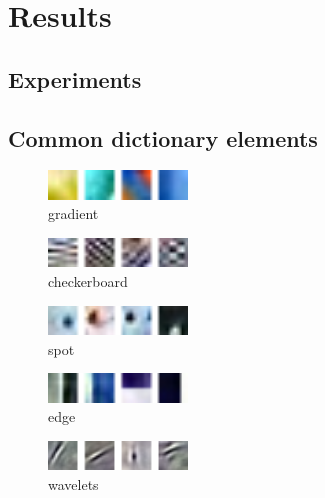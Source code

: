\chapter{Results}

\section{Experiments}

\section{Common dictionary elements}

\begin{figure}
\centering
\includegraphics[width = 0.33\textwidth]{images/gradient.png} 
\caption{gradient}
\label{fig:gradient}
\end{figure}

\begin{figure}
\centering
\includegraphics[width = 0.33\textwidth]{images/checkerboard.png}
\caption{checkerboard}
\label{fig:checkerboard}
\end{figure}


\begin{figure}
\centering
\includegraphics[width = 0.33\textwidth]{images/spot.png} 
\caption{spot}
\label{fig:spot}
\end{figure}


\begin{figure}
\centering
\includegraphics[width = 0.33\textwidth]{images/edges.png}
\caption{edge}
\label{fig:edge}
\end{figure}

\begin{figure}
\centering
\includegraphics[width = 0.33\textwidth]{images/wavelet.png}
\caption{wavelets}
\label{fig:wavelets}
\end{figure}

